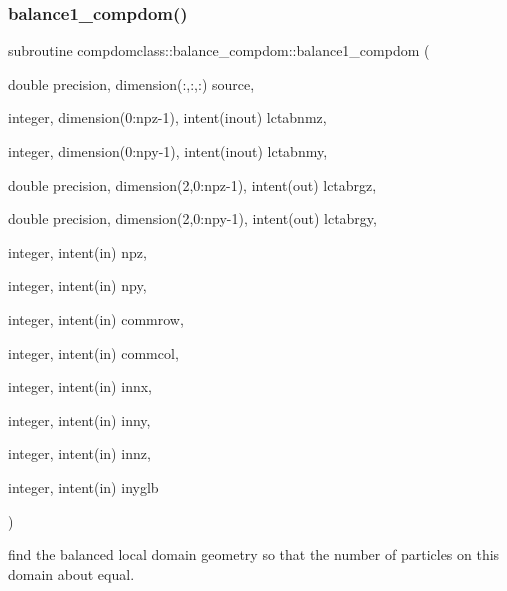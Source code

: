 \subsubsection{\texorpdfstring{balance1\_compdom()}{balance1\_compdom()}}
{\footnotesize\ttfamily subroutine compdomclass\+::balance\+\_\+compdom\+::balance1\+\_\+compdom (\begin{DoxyParamCaption}\item[{double precision, dimension(\+:,\+:,\+:)}]{source,  }\item[{integer, dimension(0\+:npz-\/1), intent(inout)}]{lctabnmz,  }\item[{integer, dimension(0\+:npy-\/1), intent(inout)}]{lctabnmy,  }\item[{double precision, dimension(2,0\+:npz-\/1), intent(out)}]{lctabrgz,  }\item[{double precision, dimension(2,0\+:npy-\/1), intent(out)}]{lctabrgy,  }\item[{integer, intent(in)}]{npz,  }\item[{integer, intent(in)}]{npy,  }\item[{integer, intent(in)}]{commrow,  }\item[{integer, intent(in)}]{commcol,  }\item[{integer, intent(in)}]{innx,  }\item[{integer, intent(in)}]{inny,  }\item[{integer, intent(in)}]{innz,  }\item[{integer, intent(in)}]{inyglb }\end{DoxyParamCaption})}



find the balanced local domain geometry so that the number of particles on this domain about equal. 

\mbox{\label{interfacecompdomclass_1_1balance__compdom_a339cc6756f770ac477ca5d635b77a75f}} 
